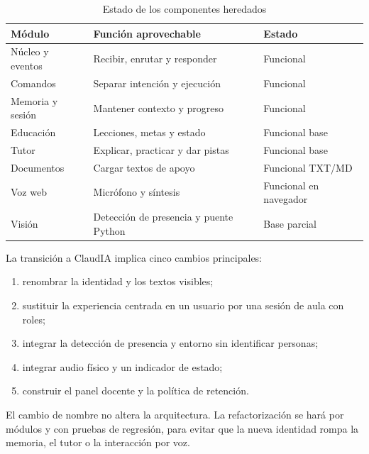 \documentclass[letterpaper,11pt]{article}
\begin{document}
\begin{table}[H]
\centering
\caption{Estado de los componentes heredados}
\small
\begin{tabularx}{\textwidth}{@{}>{\raggedright\arraybackslash}p{1.55in}>{\raggedright\arraybackslash}X>{\centering\arraybackslash}p{0.85in}@{}}
\toprule
\textbf{Módulo} & \textbf{Función aprovechable} & \textbf{Estado} \\
\midrule
Núcleo y eventos & Recibir, enrutar y responder & Funcional \\
Comandos & Separar intención y ejecución & Funcional \\
Memoria y sesión & Mantener contexto y progreso & Funcional \\
Educación & Lecciones, metas y estado & Funcional base \\
Tutor & Explicar, practicar y dar pistas & Funcional base \\
Documentos & Cargar textos de apoyo & Funcional TXT/MD \\
Voz web & Micrófono y síntesis & Funcional en navegador \\
Visión & Detección de presencia y puente Python & Base parcial \\
\bottomrule
\end{tabularx}
\end{table}

La transición a ClaudIA implica cinco cambios principales:
\begin{enumerate}
  \item renombrar la identidad y los textos visibles;
  \item sustituir la experiencia centrada en un usuario por una sesión de aula con roles;
  \item integrar la detección de presencia y entorno sin identificar personas;
  \item integrar audio físico y un indicador de estado;
  \item construir el panel docente y la política de retención.
\end{enumerate}

El cambio de nombre no altera la arquitectura. La refactorización se hará por módulos y con pruebas de regresión, para evitar que la nueva identidad rompa la memoria, el tutor o la interacción por voz.

\clearpage

\end{document}
